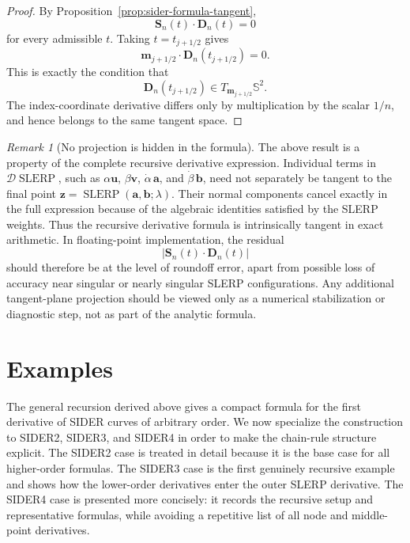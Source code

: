 \documentclass[a4paper,11pt]{article}
\newcommand{\bz}{\mathbf{z}}
\newcommand{\ba}{\mathbf{a}}
\newcommand{\bb}{\mathbf{b}}
\newcommand{\bu}{\mathbf{u}}
\newcommand{\bv}{\mathbf{v}}
\newcommand{\bD}{\mathbf{D}}
\numberwithin{equation}{section}
\theoremstyle{plain}
\theoremstyle{definition}
\theoremstyle{remark}
\newtheorem{remark}[thm]{Remark}
\newcommand{\slerp}{\operatorname{SLERP}}
\begin{document}
\begin{proof}
By Proposition~\ref{prop:sider-formula-tangent},
\[
        \mathbf{S}_n(t)\cdot\bD_n(t)=0
\]
for every admissible \(t\).  Taking \(t=t_{j+1/2}\) gives
\[
        \mathbf{m}_{j+1/2}\cdot\bD_n(t_{j+1/2})=0 .
\]
This is exactly the condition that
\[
        \bD_n(t_{j+1/2})\in T_{\mathbf{m}_{j+1/2}}\mathbb{S}^2 .
\]
The index-coordinate derivative differs only by multiplication by the scalar \(1/n\), and hence belongs to the same tangent space.
\end{proof}

\begin{remark}[No projection is hidden in the formula]
The above result is a property of the complete recursive derivative expression.  Individual terms in \(\mathcal{D}\slerp\), such as \(\alpha\bu\), \(\beta\bv\), \(\dot\alpha\,\ba\), and \(\dot\beta\,\bb\), need not separately be tangent to the final point \(\bz=\slerp(\ba,\bb;\lambda)\).  Their normal components cancel exactly in the full expression because of the algebraic identities satisfied by the SLERP weights.  Thus the recursive derivative formula is intrinsically tangent in exact arithmetic.  In floating-point implementation, the residual
\[
        \left|\mathbf{S}_n(t)\cdot\bD_n(t)\right|
\]
should therefore be at the level of roundoff error, apart from possible loss of accuracy near singular or nearly singular SLERP configurations.  Any additional tangent-plane projection should be viewed only as a numerical stabilization or diagnostic step, not as part of the analytic formula.
\end{remark}

\section{Examples}\label{sec:examples}

The general recursion derived above gives a compact formula for the first derivative of SIDER curves of arbitrary order.  We now specialize the construction to SIDER2, SIDER3, and SIDER4 in order to make the chain-rule structure explicit.  The SIDER2 case is treated in detail because it is the base case for all higher-order formulas.  The SIDER3 case is the first genuinely recursive example and shows how the lower-order derivatives enter the outer SLERP derivative.  The SIDER4 case is presented more concisely: it records the recursive setup and representative formulas, while avoiding a repetitive list of all node and middle-point derivatives.
\end{document}
